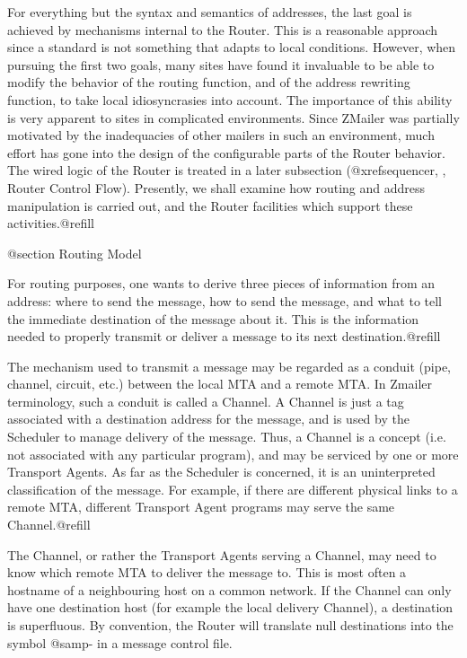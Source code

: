 {For everything but the syntax and semantics of addresses, the last goal is
achieved by mechanisms internal to the Router.  This is a reasonable approach
since a standard is not something that adapts to local conditions.  However,
when pursuing the first two goals, many sites have found it invaluable to be
able to modify the behavior of the routing function, and of the address
rewriting function, to take local idiosyncrasies into account.  The
importance of this ability is very apparent to sites in complicated
environments.  Since ZMailer was partially motivated by the inadequacies of
other mailers in such an environment, much effort has gone into the design
of the configurable parts of the Router behavior.  The wired logic of the
Router is treated in a later subsection
(@xref{sequencer, , Router Control Flow}). Presently, we shall
examine how routing and address manipulation is carried out, and the Router
facilities which support these activities.@refill

@section Routing Model

For routing purposes, one wants to derive three pieces of information from an
address: where to send the message, how to send the message, and what to tell
the immediate destination of the message about it.  This is the information
needed to properly transmit or deliver a message to its next destination.@refill

The mechanism used to transmit a message may be regarded as a conduit (pipe,
channel, circuit, etc.) between the local MTA and a remote MTA.  In Zmailer
terminology, such a conduit is called a Channel.  A Channel is just a tag
associated with a destination address for the message, and is used by the
Scheduler to manage delivery of the message.  Thus, a Channel is a concept
(i.e. not associated with any particular program), and may be serviced by
one or more Transport Agents.  As far as the Scheduler is concerned, it
is an uninterpreted classification of the message.  For example, if there
are different physical links to a remote MTA, different Transport Agent
programs may serve the same Channel.@refill

The Channel, or rather the Transport Agents serving a Channel, may need to
know which remote MTA to deliver the message to.  This is most often a
hostname of a neighbouring host on a common network.  If the Channel can
only have one destination host (for example the local delivery Channel),
a destination is superfluous.  By convention, the Router will translate
null destinations into the symbol @samp{-} in a message control file.

}
